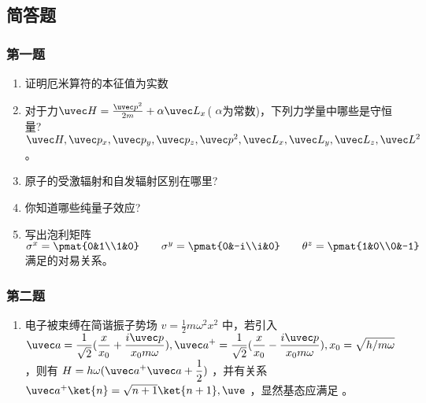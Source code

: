 
\subsection{简答题}
\subsubsection{第一题}
\begin{enumerate}
\item 证明厄米算符的本征值为实数
\item 对于力$\uvec H=\frac{\uvec p^2}{2m}+\alpha \uvec L_x$( $\alpha$为常数)，下列力学量中哪些是守恒量?\\
$\uvec H,\uvec p_x,\uvec p_y,\uvec p_z,\uvec p^2,\uvec L_x,\uvec L_y,\uvec L_z,\uvec L^2$。
\item 原子的受激辐射和自发辐射区别在哪里?
\item 你知道哪些纯量子效应?
\item 写出泡利矩阵
$\sigma^x=\pmat{0&1\\1&0}\qquad \sigma^y=\pmat{0&-i\\i&0}\qquad \theta^z=\pmat{1&0\\0&-1}$满足的对易关系。
\end{enumerate}
\subsubsection{第二题}
\begin{enumerate}
\item 电子被束缚在简谐振子势场 $v=\frac{1}{2}m\omega^2x^2$  中，若引入 $\displaystyle \uvec a =\frac{1}{\sqrt{2}}(\frac{x}{x_0}+\frac{i\uvec p}{x_0m\omega}),\uvec a^+ =\frac{1}{\sqrt{2}}(\frac{x}{x_0}-\frac{i\uvec p}{x_0m\omega}),x_0=\sqrt{h/m\omega}$ ，则有 $\displaystyle H=h\omega(\uvec a^+ \uvec a+\frac{1}{2})$ ，并有关系 $\uvec a^+ \ket{n}=\sqrt{n+1}\ket{n+1},\uve$   ，显然基态应满足  。
\end{enumerate}